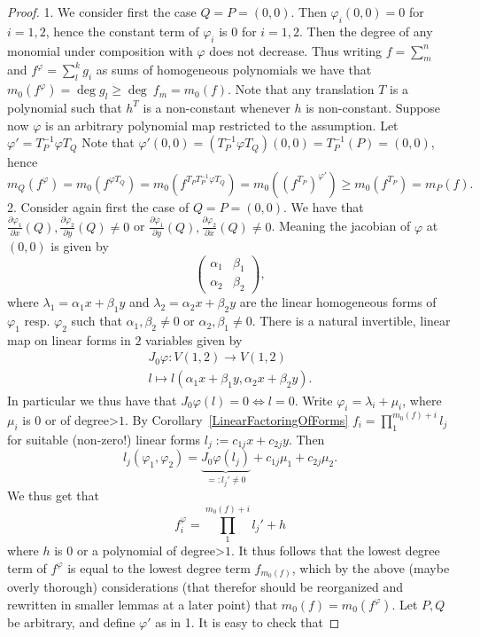     \begin{proof}
        1. We consider first the case $Q=P = (0,0)$. Then $\varphi_i(0,0)=0$ for $i=1,2$, hence the constant term of $\varphi_i$ is $0$ for $i=1,2$. Then the degree of any monomial under composition with $\varphi$ does not decrease. Thus writing $f = \sum_m^n$ and $f^\varphi = \sum_l^k g_i$ as sums of homogeneous polynomials we have that $m_0(f^\varphi)=\deg g_l\geq \deg \ f_m= m_0(f)$. Note that any translation $T$ is a polynomial such that $h^T$ is a non-constant whenever $h$ is non-constant. Suppose now $\varphi$ is an arbitrary polynomial map restricted to the assumption. Let $\varphi' = T_P^{-1}\varphi T_Q$ Note that $\varphi'(0,0)=(T_P^{-1}\varphi T_Q)(0,0)=T_P^{-1}(P)=(0,0)$, hence 
        $$m_Q(f^\varphi)=m_0(f^{ \varphi T_Q})=m_0(f^{T_PT_P^{-1}\varphi T_Q}) =m_0((f^{T_P})^{\varphi'})\geq m_0(f^{T_P})=m_P(f).$$
        2. Consider again first the case of $Q=P=(0,0)$. We have that  $\frac{\partial\varphi_1}{\partial x}(Q),\frac{\partial \varphi_2}{\partial y}(Q)\neq 0$ or $\frac{\partial\varphi_1}{\partial y}(Q),\frac{\partial \varphi_2}{\partial x}(Q)\neq 0$. Meaning the jacobian of $\varphi$ at $(0,0)$ is given by 
        $$\begin{pmatrix}
            \alpha_1 & \beta_1\\
            \alpha_2 & \beta_2
        \end{pmatrix},$$
        where $\lambda_1=\alpha_1x+\beta_1y$ and $\lambda_2=\alpha_2x+\beta_2y$ are the linear homogeneous forms of $\varphi_1$ resp. $\varphi_2$ such that $\alpha_1,\beta_2\ne 0$ or $\alpha_2,\beta_1\ne 0$. There is a natural invertible, linear map on linear forms in $2$ variables given by
        \begin{gather*}
        J_0 \varphi: V(1,2) \rightarrow V(1,2)\\
        l\mapsto l(\alpha_1 x+\beta_1y, \alpha_2x+\beta_2y).
        \end{gather*}
        In particular we thus have that $J_0\varphi (l)=0\iff l=0$. Write $\varphi_i = \lambda_i +\mu_i$, where $\mu_i$ is $0$ or of degree>$1$.
        By Corollary~\ref{LinearFactoringOfForms} $f_i=\prod_1^{m_0(f)+i} l_j$ for suitable (non-zero!) linear forms $l_j:= c_{1j}x+c_{2j}y$. Then  
        $$l_j(\varphi_1,\varphi_2)= \underbrace{J_0\varphi(l_j)}_{=:l_j'\ne 0}+ c_{1j}\mu_1+c_{2j}\mu_2.$$
        We thus get that 
        $$f_i^\varphi = \prod_1^{m_0(f)+i} l_j' + h$$
        where $h$ is $0$ or a polynomial of degree>$1$. It thus follows that the lowest degree term of $f^\varphi$ is equal to the lowest degree term $f_{m_0(f)}$, which by the above {\Large (maybe overly thorough)} considerations {\Large (that therefor should be reorganized and rewritten in smaller lemmas at a later point)} that $m_0(f)=m_0(f^\varphi)$. Let $P,Q$ be arbitrary, and define $\varphi'$ as in 1. It is easy to check that 

\end{proof}
